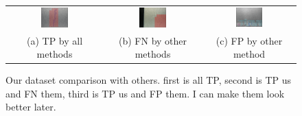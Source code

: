         
        \begin{figure}
        
            \begin{centering}
                \begin{tabular}{c|c|c}
                    \includegraphics[width=0.3\textwidth]{Images/TP_All_2.pdf} & \includegraphics[width=0.3\textwidth]{Images/TP_us_FN_them_2.png} &
                    \includegraphics[width=0.3\textwidth]{Images/FP_others_2.png} \\
                    (a) TP by all methods & (b) FN by other methods & (c) FP by other method \\
                \end{tabular}
                
                \caption{Our dataset comparison with others. first is all TP, second is TP us and FN them, third is TP us and FP them. I can make them look better later.}
                \label{plantCompareExamples}
                 
            \end{centering}
            
        \end{figure}
        

